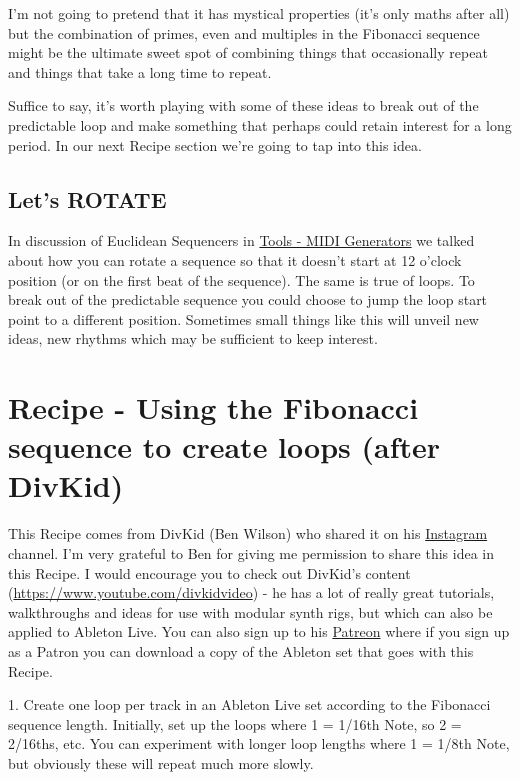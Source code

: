 \documentclass[
  12pt,
  letterpaper,
  oneside,
  open=any]{scrbook}
\begin{document}
I'm not going to pretend that it has mystical properties (it's only
maths after all) but the combination of primes, even and multiples in
the Fibonacci sequence might be the ultimate sweet spot of combining
things that occasionally repeat and things that take a long time to
repeat.

Suffice to say, it's worth playing with some of these ideas to break out
of the predictable loop and make something that perhaps could retain
interest for a long period. In our next Recipe section we're going to
tap into this idea.

\section{Let's ROTATE}\label{lets-rotate}

In discussion of Euclidean Sequencers in
\hyperref[Chapter-012-Tools-MIDI_Generators]{Tools - MIDI Generators} we
talked about how you can rotate a sequence so that it doesn't start at
12 o'clock position (or on the first beat of the sequence). The same is
true of loops. To break out of the predictable sequence you could choose
to jump the loop start point to a different position. Sometimes small
things like this will unveil new ideas, new rhythms which may be
sufficient to keep interest.


\chapter{Recipe - Using the Fibonacci sequence to create loops (after
DivKid)}\label{Chapter-022-Recipe-Fibonacci_loops}

This Recipe comes from DivKid (Ben Wilson) who shared it on his
\href{https://www.instagram.com/divkidvideo}{Instagram} channel. I'm
very grateful to Ben for giving me permission to share this idea in this
Recipe. I would encourage you to check out DivKid's content
(\url{https://www.youtube.com/divkidvideo}) - he has a lot of really
great tutorials, walkthroughs and ideas for use with modular synth rigs,
but which can also be applied to Ableton Live. You can also sign up to
his \href{https://www.patreon.com/DivKid}{Patreon} where if you sign up
as a Patron you can download a copy of the Ableton set that goes with
this Recipe.

1. Create one loop per track in an Ableton Live set according to the
Fibonacci sequence length. Initially, set up the loops where 1 = 1/16th
Note, so 2 = 2/16ths, etc. You can experiment with longer loop lengths
where 1 = 1/8th Note, but obviously these will repeat much more slowly.
\end{document}
